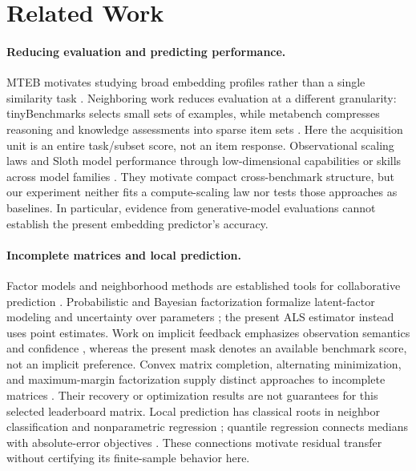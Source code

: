 \documentclass{article}
\begin{document}
\section{Related Work}
\paragraph{Reducing evaluation and predicting performance.}
MTEB motivates studying broad embedding profiles rather than a single similarity task \citep{MTEB}. Neighboring work reduces evaluation at a different granularity: tinyBenchmarks selects small sets of examples, while metabench compresses reasoning and knowledge assessments into sparse item sets \citep{TinyBenchmarks,MetaBench}. Here the acquisition unit is an entire task/subset score, not an item response. Observational scaling laws and Sloth model performance through low-dimensional capabilities or skills across model families \citep{ObservationalScaling,Sloth}. They motivate compact cross-benchmark structure, but our experiment neither fits a compute-scaling law nor tests those approaches as baselines. In particular, evidence from generative-model evaluations cannot establish the present embedding predictor's accuracy.

\paragraph{Incomplete matrices and local prediction.}
Factor models and neighborhood methods are established tools for collaborative prediction \citep{Koren2009,Takacs2008}. Probabilistic and Bayesian factorization formalize latent-factor modeling and uncertainty over parameters \citep{Mnih2007,Salakhutdinov2008}; the present ALS estimator instead uses point estimates. Work on implicit feedback emphasizes observation semantics and confidence \citep{Hu2008}, whereas the present mask denotes an available benchmark score, not an implicit preference. Convex matrix completion, alternating minimization, and maximum-margin factorization supply distinct approaches to incomplete matrices \citep{Candes2009,Jain2013,Rennie2005}. Their recovery or optimization results are not guarantees for this selected leaderboard matrix. Local prediction has classical roots in neighbor classification and nonparametric regression \citep{Cover1967,Stone1977}; quantile regression connects medians with absolute-error objectives \citep{Koenker2001}. These connections motivate residual transfer without certifying its finite-sample behavior here.
\end{document}
